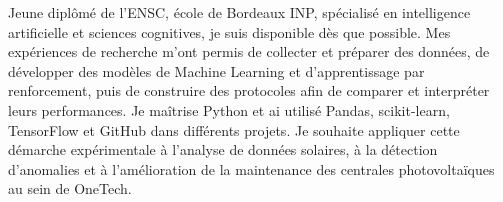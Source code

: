
\begin{cvparagraph}
Jeune diplômé de l’ENSC, école de Bordeaux INP, spécialisé en intelligence artificielle et sciences cognitives, je suis disponible dès que possible. Mes expériences de recherche m’ont permis de collecter et préparer des données, de développer des modèles de Machine Learning et d’apprentissage par renforcement, puis de construire des protocoles afin de comparer et interpréter leurs performances. Je maîtrise Python et ai utilisé Pandas, scikit-learn, TensorFlow et GitHub dans différents projets. Je souhaite appliquer cette démarche expérimentale à l’analyse de données solaires, à la détection d’anomalies et à l’amélioration de la maintenance des centrales photovoltaïques au sein de OneTech.
\end{cvparagraph}
